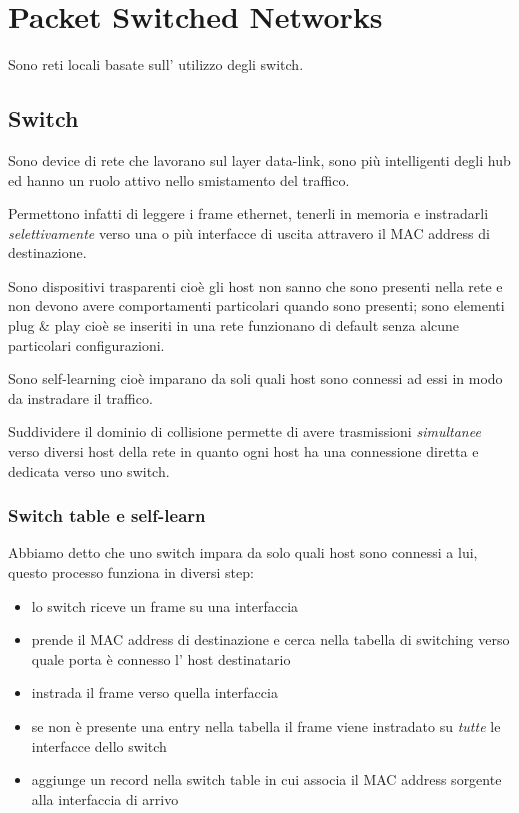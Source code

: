 \section{Packet Switched Networks}
Sono reti locali basate sull' utilizzo degli switch.
\subsection{Switch}
Sono device di rete che lavorano sul layer data-link, sono più intelligenti degli hub ed hanno un ruolo attivo nello smistamento del traffico.

Permettono infatti di leggere i frame ethernet, tenerli in memoria e instradarli \emph{selettivamente} verso una o più interfacce di uscita attravero il MAC address di destinazione.

Sono dispositivi trasparenti cioè gli host non sanno che sono presenti nella rete e non devono avere comportamenti particolari quando sono presenti; sono elementi plug \& play cioè se inseriti in una rete funzionano di default senza alcune particolari configurazioni.

Sono self-learning cioè imparano da soli quali host sono connessi ad essi in modo da instradare il traffico.

Suddividere il dominio di collisione permette di avere trasmissioni \emph{simultanee} verso diversi host della rete in quanto ogni host ha una connessione diretta e dedicata verso uno switch.

\subsubsection{Switch table e self-learn}
Abbiamo detto che uno switch impara da solo quali host sono connessi a lui, questo processo funziona in diversi step:
\begin{itemize}
    \item lo switch riceve un frame su una interfaccia
    \item prende il MAC address di destinazione e cerca nella tabella di switching verso quale porta è connesso l' host destinatario
    \item instrada il frame verso quella interfaccia
    \item se non è presente una entry nella tabella il frame viene instradato su \emph{tutte} le interfacce dello switch
    \item aggiunge un record nella switch table in cui associa il MAC address sorgente alla interfaccia di arrivo
\end{itemize}


